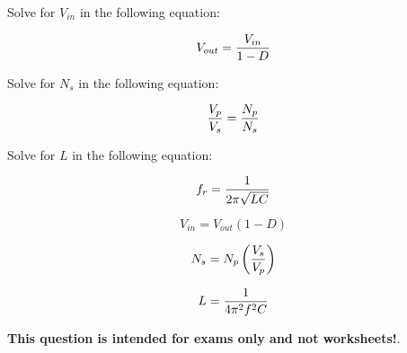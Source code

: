 

Solve for $V_{in}$ in the following equation:

$$V_{out} = {V_{in} \over {1 - D}}$$

\vskip 20pt

Solve for $N_s$ in the following equation:

$${V_p \over V_s} = {N_p \over N_s}$$

\vskip 20pt

Solve for $L$ in the following equation:

$$f_r = {1 \over {2 \pi \sqrt{LC}}}$$







$$V_{in} = V_{out}(1 - D)$$

$$N_s = N_p \left({V_s \over V_p}\right)$$

$$L = {1 \over {4 \pi^2 f^2 C}}$$







{\bf This question is intended for exams only and not worksheets!}.




